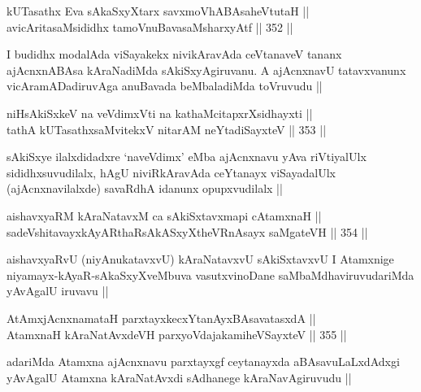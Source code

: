 \begin{shl}
kUTasathx Eva sAkaSxyXtarx savxmoVhABAsaheVtutaH || \\
avicAritasaMsididhx tamoV\s nuBavasaMsharxyAtf ||  352 ||  
\end{shl}

\begin{artha}
I budidhx modalAda viSayakekx nivikAravAda ceVtanaveV tananx ajAcnxnABAsa kAraNadiMda sAkiSxyAgiruvanu. A ajAcnxnavU tatavxvanunx vicAramADadiruvAga anuBavada beMbaladiMda toVruvudu ||
\end{artha}


\begin{shl}
niHsAkiSxkeV na veVdimxVti na kathaMcitapxrXsidhayxti || \\
tathA kUTasathxsaMvitekxV nitarAM neYtadiSayxteV ||  353 ||  
\end{shl}

\begin{artha}
sAkiSxye ilalxdidadxre `naveVdimx' eMba ajAcnxnavu yAva riVtiyalUlx sididhxsuvudilalx, hAgU niviRkAravAda ceYtanayx viSayadalUlx (ajAcnxnavilalxde) savaRdhA idanunx opupxvudilalx ||
\end{artha}

\begin{shl}
aishavxyaRM kAraNatavxM ca sAkiSxtavxmapi cA\s \s tamxnaH || \\
sadeVshitavayxkAyARthaRsAkASxyXtheVRnAsayx saMgateVH ||  354 ||  
\end{shl}

\begin{artha}
aishavxyaRvU (niyAnukatavxvU) kAraNatavxvU sAkiSxtavxvU I Atamxnige niyamayx-kAyaR-sAkaSxyXveMbuva vasutxvinoDane saMbaMdhaviruvudariMda yAvAgalU iruvavu ||
\end{artha}


\begin{shl}
AtAmxjAcnxnamataH parxtayxkecxYtanAyxBAsavatasxdA || \\
AtamxnaH kAraNatAvxdeVH parxyoVdajakamiheVSayxteV ||  355 ||  
\end{shl}

\begin{artha}
adariMda Atamxna ajAcnxnavu parxtayxgf ceytanayxda aBAsavuLaLxdAdxgi yAvAgalU Atamxna kAraNatAvxdi sAdhanege kAraNavAgiruvudu ||
\end{artha}

